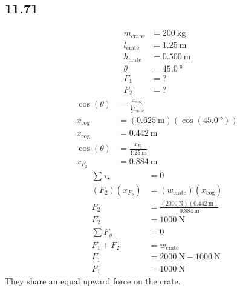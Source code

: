 \documentclass{article}
\begin{document}
\subsection{11.71}
\begin{align*}
	m_\text{crate} & = \SI{200}{\kilogram} \\
	l_\text{crate} & = \SI{1.25}{\meter} \\
	h_\text{crate} & = \SI{0.500}{\meter} \\
	\theta & = \SI{45.0}{\degree} \\
	F_1 & = ? \\
	F_2 & = ?
\end{align*}
\begin{align*}
	\cos(\theta) & = \frac{x_\text{cog}}{\frac{1}{2}l_\text{crate}} \\
	x_\text{cog} & = (\SI{0.625}{\meter})(\cos(\SI{45.0}{\degree})) \\
	x_\text{cog} & = \SI{0.442}{\meter} \\
	\cos(\theta) & = \frac{x_{F_2}}{\SI{1.25}{\meter}} \\
	x_{F_2} & = \SI{0.884}{\meter}
\end{align*}
\begin{align*}
	\sum \tau_\star & = 0 \\
	(F_2)(x_{F_2}) & = (w_\text{crate})(x_\text{cog}) \\
	F_2 & = \frac{(\SI{2000}{\newton})(\SI{0.442}{\meter})}{\SI{0.884}{\meter}} \\
	F_2 & = \SI{1000}{\newton} \\
	\sum F_y & = 0 \\
	F_1 + F_2 & = w_\text{crate} \\
	F_1 & = \SI{2000}{\newton} - \SI{1000}{\newton} \\
	F_1 & = \SI{1000}{\newton}
\end{align*}
They share an equal upward force on the crate.
\end{document}
